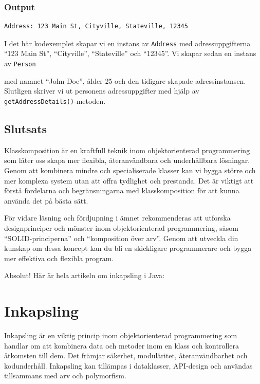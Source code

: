 \hypertarget{output}{%
\subsubsection{Output}\label{output}}

\begin{verbatim}
Address: 123 Main St, Cityville, Stateville, 12345
\end{verbatim}

I det här kodexemplet skapar vi en instans av \texttt{Address} med
adressuppgifterna ``123 Main St'', ``Cityville'', ``Stateville'' och
``12345''. Vi skapar sedan en instans av \texttt{Person}

med namnet ``John Doe'', ålder 25 och den tidigare skapade
adressinstansen. Slutligen skriver vi ut personens adressuppgifter med
hjälp av \texttt{getAddressDetails()}-metoden.

\hypertarget{slutsats}{%
\subsection{Slutsats}\label{slutsats}}

Klasskomposition är en kraftfull teknik inom objektorienterad
programmering som låter oss skapa mer flexibla, återanvändbara och
underhållbara lösningar. Genom att kombinera mindre och specialiserade
klasser kan vi bygga större och mer komplexa system utan att offra
tydlighet och prestanda. Det är viktigt att förstå fördelarna och
begränsningarna med klasskomposition för att kunna använda det på bästa
sätt.

För vidare läsning och fördjupning i ämnet rekommenderas att utforska
designprinciper och mönster inom objektorienterad programmering, såsom
``SOLID-principerna'' och ``komposition över arv''. Genom att utveckla
din kunskap om dessa koncept kan du bli en skickligare programmerare och
bygga mer effektiva och flexibla program.

Absolut! Här är hela artikeln om inkapsling i Java:

\hypertarget{inkapsling}{%
\section{Inkapsling}\label{inkapsling}}

Inkapsling är en viktig princip inom objektorienterad programmering som
handlar om att kombinera data och metoder inom en klass och kontrollera
åtkomsten till dem. Det främjar säkerhet, moduläritet, återanvändbarhet
och kodunderhåll. Inkapsling kan tillämpas i dataklasser, API-design och
användas tillsammans med arv och polymorfism.

